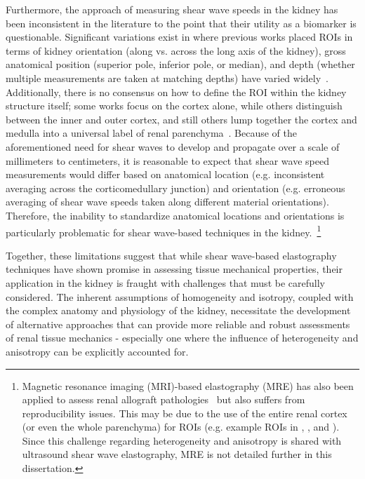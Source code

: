 Furthermore, the approach of measuring shear wave speeds in the kidney has been inconsistent in the literature to the point that their utility as a biomarker is questionable. Significant variations exist in where previous works placed ROIs in terms of kidney orientation (along vs. across the long axis of the kidney), gross anatomical position (superior pole, inferior pole, or median), and depth (whether multiple measurements are taken at matching depths) have varied widely~\cite{barr_Can_2020,ce_Ultrasound_2023,ng_Shear_2024,urban_Novel_2021}. Additionally, there is no consensus on how to define the ROI within the kidney structure itself; some works focus on the cortex alone, while others distinguish between the inner and outer cortex, and still others lump together the cortex and medulla into a universal label of renal parenchyma~\cite{ce_Ultrasound_2023}. Because of the aforementioned need for shear waves to develop and propagate over a scale of millimeters to centimeters, it is reasonable to expect that shear wave speed measurements would differ based on anatomical location (e.g. inconsistent averaging across the corticomedullary junction) and orientation (e.g. erroneous averaging of shear wave speeds taken along different material orientations). Therefore, the inability to standardize anatomical locations and orientations is particularly problematic for shear wave-based techniques in the kidney.~\footnote{
    Magnetic resonance imaging (MRI)-based elastography (MRE) has also been applied to assess renal allograft pathologies~\cite{lee_MR_2012,kirpalani_Magnetic_2017} but also suffers from reproducibility issues. This may be due to the use of the entire renal cortex (or even the whole parenchyma) for ROIs (e.g. example ROIs in \cite{kennedy_Magnetic_2020}, \cite{chauveau_Magnetic_2022}, and \cite{shatil_Magnetic_2022}). Since this challenge regarding heterogeneity and anisotropy is shared with ultrasound shear wave elastography, MRE is not detailed further in this dissertation.
}

Together, these limitations suggest that while shear wave-based elastography techniques have shown promise in assessing tissue mechanical properties, their application in the kidney is fraught with challenges that must be carefully considered. The inherent assumptions of homogeneity and isotropy, coupled with the complex anatomy and physiology of the kidney, necessitate the development of alternative approaches that can provide more reliable and robust assessments of renal tissue mechanics - especially one where the influence of heterogeneity and anisotropy can be explicitly accounted for.

